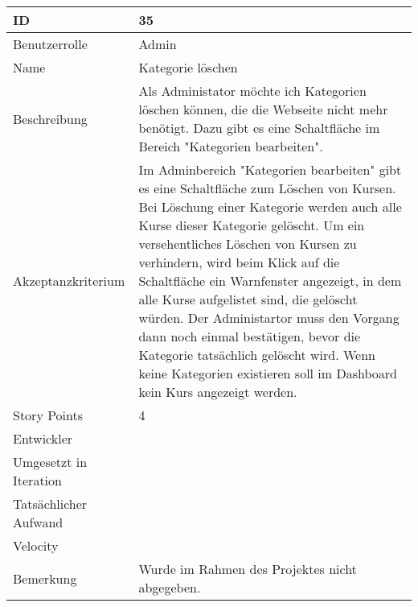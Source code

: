 \begin{tabularx}{\textwidth}{|p{}|X|}
	\hline
	ID & 35\\
	\hline
	Benutzerrolle & Admin\\
	\hline
	Name & Kategorie löschen\\
	\hline
	Beschreibung & Als Administator möchte ich Kategorien löschen können, die die Webseite nicht mehr benötigt. Dazu gibt es eine Schaltfläche im Bereich "Kategorien bearbeiten".\\
	\hline
	Akzeptanzkriterium & Im Adminbereich "Kategorien bearbeiten" gibt es eine Schaltfläche zum Löschen von Kursen. Bei Löschung einer Kategorie werden auch alle Kurse dieser Kategorie gelöscht. Um ein versehentliches Löschen von Kursen zu verhindern, wird beim Klick auf die Schaltfläche ein Warnfenster angezeigt, in dem alle Kurse aufgelistet sind, die gelöscht würden. Der Administartor muss den Vorgang dann noch einmal bestätigen, bevor die Kategorie tatsächlich gelöscht wird.  Wenn keine Kategorien existieren soll im Dashboard kein Kurs angezeigt werden.\\
	\hline
	Story Points & 4 \\
	\hline
	Entwickler & \\
	\hline
	Umgesetzt in Iteration & \\
	\hline
	Tatsächlicher Aufwand & \\
	\hline
	Velocity & \\
	\hline
	Bemerkung & Wurde im Rahmen des Projektes nicht abgegeben.\\
	\hline
\end{tabularx}
\vspace{20pt}
